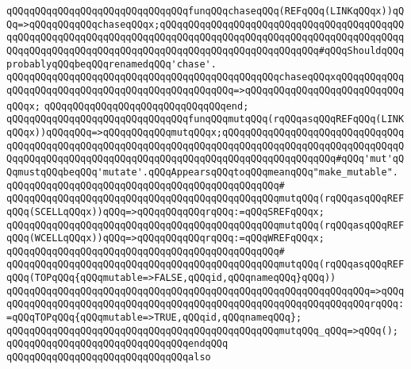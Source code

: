 \newline
\verb|qQQqqQQqqQQqqQQqqQQqqQQqqQQqqQQqfunqQQqchaseqQQq(REFqQQq(LINKqQQqx))qQQq=>qQQqqQQqqQQqchaseqQQqx;qQQqqQQqqQQqqQQqqQQqqQQqqQQqqQQqqQQqqQQqqQQqqQQqqQQqqQQqqQQqqQQqqQQqqQQqqQQqqQQqqQQqqQQqqQQqqQQqqQQqqQQqqQQqqQQqqQQqqQQqqQQqqQQqqQQqqQQqqQQqqQQqqQQqqQQqqQQqqQQqqQQqqQQq#qQQqShouldqQQqprobablyqQQqbeqQQqrenamedqQQq'chase'.|\newline
\verb|qQQqqQQqqQQqqQQqqQQqqQQqqQQqqQQqqQQqqQQqqQQqqQQqchaseqQQqxqQQqqQQqqQQqqQQqqQQqqQQqqQQqqQQqqQQqqQQqqQQqqQQqqQQq=>qQQqqQQqqQQqqQQqqQQqqQQqqQQqqQQqx;|\newline
\verb|qQQqqQQqqQQqqQQqqQQqqQQqqQQqqQQqend;|\newline
\newline
\verb|qQQqqQQqqQQqqQQqqQQqqQQqqQQqqQQqfunqQQqmutqQQq(rqQQqasqQQqREFqQQq(LINKqQQqx))qQQqqQQq=>qQQqqQQqqQQqmutqQQqx;qQQqqQQqqQQqqQQqqQQqqQQqqQQqqQQqqQQqqQQqqQQqqQQqqQQqqQQqqQQqqQQqqQQqqQQqqQQqqQQqqQQqqQQqqQQqqQQqqQQqqQQqqQQqqQQqqQQqqQQqqQQqqQQqqQQqqQQqqQQqqQQqqQQqqQQqqQQqqQQq#qQQq'mut'qQQqmustqQQqbeqQQq'mutate'.qQQqAppearsqQQqtoqQQqmeanqQQq"make_mutable".|\newline
\verb|qQQqqQQqqQQqqQQqqQQqqQQqqQQqqQQqqQQqqQQqqQQqqQQq#|\newline
\verb|qQQqqQQqqQQqqQQqqQQqqQQqqQQqqQQqqQQqqQQqqQQqqQQqmutqQQq(rqQQqasqQQqREFqQQq(SCELLqQQqx))qQQq=>qQQqqQQqqQQqrqQQq:=qQQqSREFqQQqx;|\newline
\verb|qQQqqQQqqQQqqQQqqQQqqQQqqQQqqQQqqQQqqQQqqQQqqQQqmutqQQq(rqQQqasqQQqREFqQQq(WCELLqQQqx))qQQq=>qQQqqQQqqQQqrqQQq:=qQQqWREFqQQqx;|\newline
\verb|qQQqqQQqqQQqqQQqqQQqqQQqqQQqqQQqqQQqqQQqqQQqqQQq#|\newline
\verb|qQQqqQQqqQQqqQQqqQQqqQQqqQQqqQQqqQQqqQQqqQQqqQQqmutqQQq(rqQQqasqQQqREFqQQq(TOPqQQq{qQQqmutable=>FALSE,qQQqid,qQQqnameqQQq}qQQq))|\newline
\verb|qQQqqQQqqQQqqQQqqQQqqQQqqQQqqQQqqQQqqQQqqQQqqQQqqQQqqQQqqQQqqQQq=>qQQq|\newline
\verb|qQQqqQQqqQQqqQQqqQQqqQQqqQQqqQQqqQQqqQQqqQQqqQQqqQQqqQQqqQQqqQQqrqQQq:=qQQqTOPqQQq{qQQqmutable=>TRUE,qQQqid,qQQqnameqQQq};|\newline
\newline
\newline
\verb|qQQqqQQqqQQqqQQqqQQqqQQqqQQqqQQqqQQqqQQqqQQqqQQqmutqQQq_qQQq=>qQQq();|\newline
\verb|qQQqqQQqqQQqqQQqqQQqqQQqqQQqqQQqendqQQq|\newline
\newline
\verb|qQQqqQQqqQQqqQQqqQQqqQQqqQQqqQQqalso|\newline
